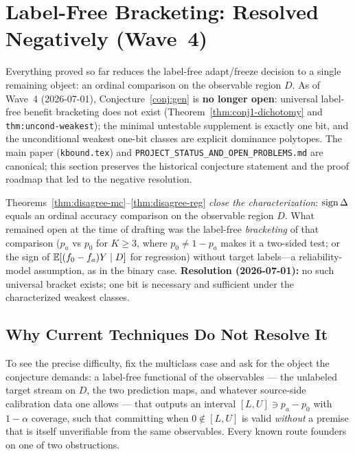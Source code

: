 \section{Label-Free Bracketing: Resolved Negatively (Wave~4)}
\label{sec:t2-open}

Everything proved so far reduces the label-free adapt/freeze decision to a single
remaining object: an ordinal comparison on the observable region $D$. As of Wave~4
(2026-07-01), Conjecture~\ref{conj:gen} is \textbf{no longer open}: universal
label-free benefit bracketing does not exist (Theorem~\ref{thm:conj1-dichotomy} and
\texttt{thm:uncond-weakest}); the minimal untestable supplement is exactly one bit,
and the unconditional weakest one-bit classes are explicit dominance polytopes. The
main paper (\texttt{kbound.tex}) and \texttt{PROJECT\_STATUS\_AND\_OPEN\_PROBLEMS.md}
are canonical; this section preserves the historical conjecture statement and the
proof roadmap that led to the negative resolution.

\begin{conjecture}
\label{conj:gen}
Theorems~\ref{thm:disagree-mc}--\ref{thm:disagree-reg} \emph{close the characterization}:
$\operatorname{sign}\Delta$ equals an ordinal accuracy comparison on the observable region $D$. What
remained open at the time of drafting was the label-free \emph{bracketing} of that
comparison ($p_a$ vs $p_0$ for $K\ge3$, where $p_0\neq1-p_a$ makes it a two-sided test;
or the sign of $\mathbb{E}[(f_0-f_a)Y\mid D]$ for regression) without target labels---a
reliability-model assumption, as in the binary case. \textbf{Resolution (2026-07-01):}
no such universal bracket exists; one bit is necessary and sufficient under the
characterized weakest classes.
\end{conjecture}

\subsection{Why Current Techniques Do Not Resolve It}
\label{sec:t2-open-why}

To see the precise difficulty, fix the multiclass case and ask for the object the
conjecture demands: a label-free functional of the observables --- the unlabeled target
stream on $D$, the two prediction maps, and whatever source-side calibration data one
allows --- that outputs an interval $[L,U]\ni p_a-p_0$ with $1-\alpha$ coverage, such
that committing when $0\notin[L,U]$ is valid \emph{without} a premise that is itself
unverifiable from the same observables. Every known route founders on one of two
obstructions.

